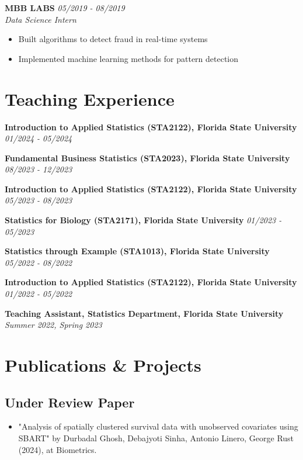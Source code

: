 \documentclass[11pt,a4paper]{article}
\newcommand{\entry}[4]{
  \noindent\textbf{#1} \hfill \textit{#2}\\
  \textit{#3}\\
  #4
  \vspace{0.4cm}
}
\newcommand{\simpleentry}[2]{
  \noindent\textbf{#1} \hfill \textit{#2}\\
  \vspace{0.2cm}
}
\begin{document}
\entry{MBB LABS}{05/2019 - 08/2019}{Data Science Intern}{
  \begin{itemize}[leftmargin=*,noitemsep,topsep=0pt]
    \item Built algorithms to detect fraud in real-time systems
    \item Implemented machine learning methods for pattern detection
  \end{itemize}
}

\section{Teaching Experience}

\simpleentry{Introduction to Applied Statistics (STA2122), Florida State University}{01/2024 - 05/2024}
\simpleentry{Fundamental Business Statistics (STA2023), Florida State University}{08/2023 - 12/2023}
\simpleentry{Introduction to Applied Statistics (STA2122), Florida State University}{05/2023 - 08/2023}
\simpleentry{Statistics for Biology (STA2171), Florida State University}{01/2023 - 05/2023}
\simpleentry{Statistics through Example (STA1013), Florida State University}{05/2022 - 08/2022}
\simpleentry{Introduction to Applied Statistics (STA2122), Florida State University}{01/2022 - 05/2022}
\simpleentry{Teaching Assistant, Statistics Department, Florida State University}{Summer 2022, Spring 2023}

\section{Publications \& Projects}

\subsection{Under Review Paper}
\begin{itemize}[leftmargin=*]
  \item "Analysis of spatially clustered survival data with unobserved covariates using SBART" by Durbadal Ghosh, Debajyoti Sinha, Antonio Linero, George Rust (2024), at Biometrics.
\end{itemize}
\end{document}
